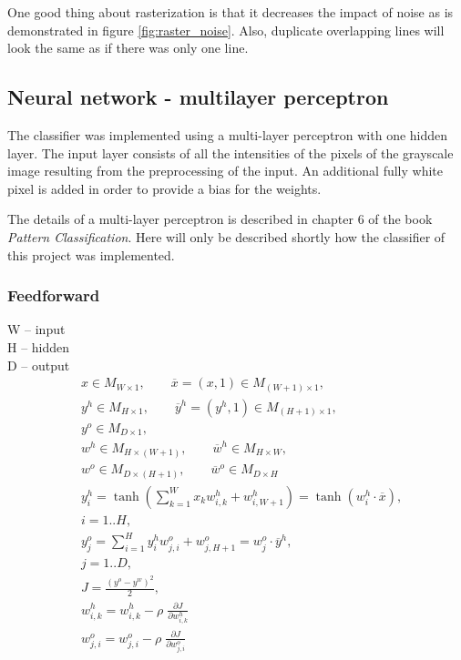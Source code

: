 \documentclass[report.tex]{subfile}
\begin{document}
One good thing about rasterization is that it decreases the impact of noise as
is demonstrated in figure \ref{fig:raster_noise}. Also, duplicate overlapping
lines will look the same as if there was only one line.

\subsection{Neural network - multilayer perceptron}
\begin{figure}
    \centering
    
    \caption{}
    \label{fig:mlp}
\end{figure}
The classifier was implemented using a multi-layer perceptron with one hidden
layer. The input layer consists of all the intensities of the pixels of the
grayscale image resulting from the preprocessing of the input. An additional
fully white pixel is added in order to provide a bias for the weights.

The details of a multi-layer perceptron is described in chapter 6 of the book
\emph{Pattern Classification}\cite{hart-pattern}. Here will only be described
shortly how the classifier of this project was implemented.

\subsubsection{Feedforward}
W -- input \\
H -- hidden \\
D -- output \\

\begin{align}
&x \in M_{W \times 1}, \qquad
\overline x = \left( x, 1 \right) \in M_{(W+1) \times 1}, \\
&y^h \in M_{H \times 1}, \qquad
\overline y^h = \left( y^h, 1 \right) \in M_{(H+1) \times 1}, \\
&y^o \in M_{D \times 1}, \\
&w^h \in M_{H \times (W + 1)}, \qquad
\overline w^h \in M_{H \times W}, \\
&w^o \in M_{D \times (H + 1)}, \qquad
\overline w^o \in M_{D \times H} \\
&y^h_i = \tanh \left( \sum_{k=1}^{W} x_k w^h_{i,k} + w^h_{i,W+1} \right) = \tanh \left( w^h_i \cdot \overline x \right), \\
&i = 1..H, \\
&y^o_j = \sum_{i=1}^{H} y^h_i w^o_{j,i} + w^o_{j,H+1} = w^o_j \cdot \overline y^h, \\
&j = 1..D, \\
&J = \frac{(y^o - y^w)^2}{2}, \\
&w^h_{i,k} = w^h_{i,k} - \rho \; \frac{\partial J}{\partial w^h_{i,k}} \\
&w^o_{j,i} = w^o_{j,i} - \rho \; \frac{\partial J}{\partial w^o_{j,i}}
\end{align}
\end{document}
